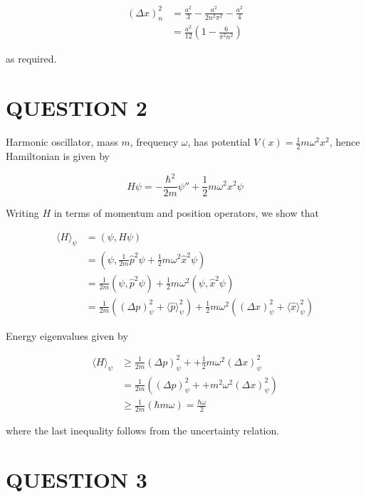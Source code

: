 \documentclass[a4paper]{article}
\begin{document}
\begin{align*}
(\Delta x)_{n}^{2} & = \frac{a^{2}}{3}  - \frac{a^{2}}{2 n^{2}\pi^{2}}  - \frac{a^{2}}{4} \\
& = \frac{a^{2}}{12} \left( 1 - \frac{6}{\pi^{2} n^{2}} \right) 
\end{align*}

as required.



\section{QUESTION 2}


Harmonic oscillator, mass $ m $, frequency $ \omega $, has potential $ V(x) = \frac{1}{2} m \omega^{2} x^{2} $, hence Hamiltonian is given by

\[ H \psi = - \frac{\hbar^{2}}{2m} \psi'' + \frac{1}{2} m \omega^{2} x^{2} \psi  \]

Writing $ H $ in terms of momentum and position operators, we show that

\begin{align*}
\langle H \rangle_{\psi} & = ( \psi, H \psi )  \\
& = ( \psi,  \frac{1}{2m} \hat{p}^{2} \psi + \frac{1}{2} m \omega^{2} \hat{x}^{2} \psi   ) \\
& = \frac{1}{2m} ( \psi, \hat{p}^{2} \psi) + \frac{1}{2} m \omega^{2} (\psi, \hat{x}^{2} \psi) \\
& = \frac{1}{2m} \left(  (\Delta p)_{\psi}^{2} + \langle \hat{p} \rangle_{\psi}^{2}  \right)  + \frac{1}{2} m \omega^{2} \left(  ( \Delta x)_{\psi}^{2} + \langle \hat{x} \rangle_{\psi}^{2}  \right)
\end{align*}

Energy eigenvalues given by


\begin{align*}
\langle H \rangle_{\psi} & \geq \frac{1}{2m} (\Delta p)_{\psi}^{2} +   + \frac{1}{2} m \omega^{2}( \Delta x)_{\psi}^{2} \\
& = \frac{1}{2m} \left( (\Delta p)_{\psi}^{2} +   + m^{2} \omega^{2}( \Delta x)_{\psi}^{2}  \right)  \\
& \geq  \frac{1}{2m} \left(  \hbar m \omega \right) = \frac{\hbar \omega}{2} 
\end{align*}

where the last inequality follows from the uncertainty relation.
\section{QUESTION 3}
\end{document}
